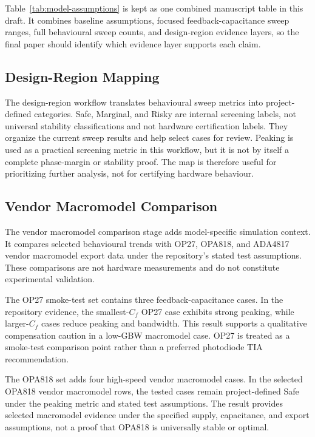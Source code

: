 Table~\ref{tab:model-assumptions} is kept as one combined manuscript table in this draft. It combines baseline assumptions, focused feedback-capacitance sweep ranges, full behavioural sweep counts, and design-region evidence layers, so the final paper should identify which evidence layer supports each claim.

\subsection{Design-Region Mapping}

The design-region workflow translates behavioural sweep metrics into project-defined categories. Safe, Marginal, and Risky are internal screening labels, not universal stability classifications and not hardware certification labels. They organize the current sweep results and help select cases for review. Peaking is used as a practical screening metric in this workflow, but it is not by itself a complete phase-margin or stability proof. The map is therefore useful for prioritizing further analysis, not for certifying hardware behaviour.

\subsection{Vendor Macromodel Comparison}

The vendor macromodel comparison stage adds model-specific simulation context. It compares selected behavioural trends with OP27, OPA818, and ADA4817 vendor macromodel export data under the repository's stated test assumptions. These comparisons are not hardware measurements and do not constitute experimental validation.

The OP27 smoke-test set contains three feedback-capacitance cases. In the repository evidence, the smallest-$C_f$ OP27 case exhibits strong peaking, while larger-$C_f$ cases reduce peaking and bandwidth. This result supports a qualitative compensation caution in a low-GBW macromodel case. OP27 is treated as a smoke-test comparison point rather than a preferred photodiode TIA recommendation.

The OPA818 set adds four high-speed vendor macromodel cases. In the selected OPA818 vendor macromodel rows, the tested cases remain project-defined Safe under the peaking metric and stated test assumptions. The result provides selected macromodel evidence under the specified supply, capacitance, and export assumptions, not a proof that OPA818 is universally stable or optimal.

